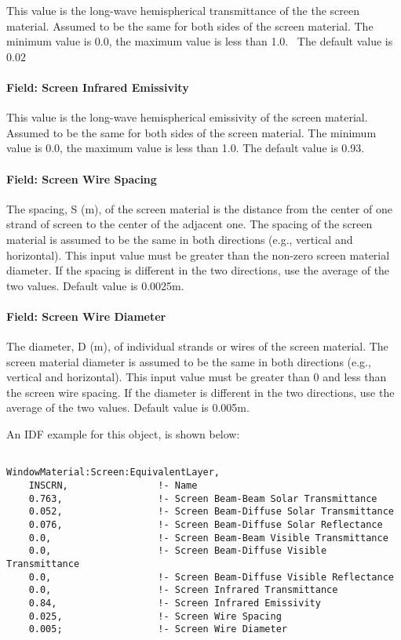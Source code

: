 This value is the long-wave hemispherical transmittance of the the screen material. Assumed to be the same for both sides of the screen material. The minimum value is 0.0, the maximum value is less than 1.0.~ The default value is 0.02

\paragraph{Field: Screen Infrared Emissivity}\label{field-screen-infrared-emissivity}

This value is the long-wave hemispherical emissivity of the screen material. Assumed to be the same for both sides of the screen material. The minimum value is 0.0, the maximum value is less than 1.0. The default value is 0.93.

\paragraph{Field: Screen Wire Spacing}\label{field-screen-wire-spacing}

The spacing, S (m), of the screen material is the distance from the center of one strand of screen to the center of the adjacent one. The spacing of the screen material is assumed to be the same in both directions (e.g., vertical and horizontal). This input value must be greater than the non-zero screen material diameter. If the spacing is different in the two directions, use the average of the two values. Default value is 0.0025m.

\paragraph{Field: Screen Wire Diameter}\label{field-screen-wire-diameter}

The diameter, D (m), of individual strands or wires of the screen material. The screen material diameter is assumed to be the same in both directions (e.g., vertical and horizontal). This input value must be greater than 0 and less than the screen wire spacing. If the diameter is different in the two directions, use the average of the two values. Default value is 0.005m.

An IDF example for this object, is shown below:

\begin{lstlisting}

WindowMaterial:Screen:EquivalentLayer,
    INSCRN,                !- Name
    0.763,                 !- Screen Beam-Beam Solar Transmittance
    0.052,                 !- Screen Beam-Diffuse Solar Transmittance
    0.076,                 !- Screen Beam-Diffuse Solar Reflectance
    0.0,                   !- Screen Beam-Beam Visible Transmittance
    0.0,                   !- Screen Beam-Diffuse Visible Transmittance
    0.0,                   !- Screen Beam-Diffuse Visible Reflectance
    0.0,                   !- Screen Infrared Transmittance
    0.84,                  !- Screen Infrared Emissivity
    0.025,                 !- Screen Wire Spacing
    0.005;                 !- Screen Wire Diameter
\end{lstlisting}

